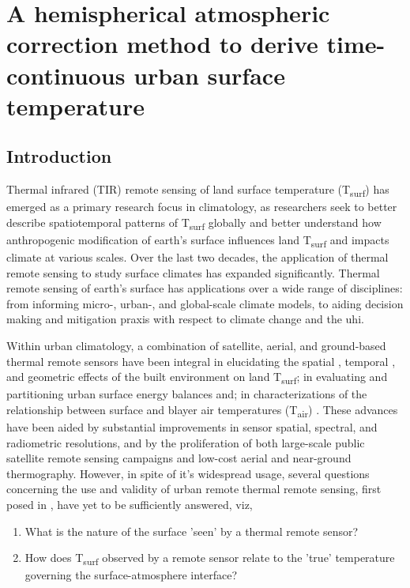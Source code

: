 \chapter{A hemispherical atmospheric correction method to derive time-continuous urban surface temperature}\label{paper1}


\section{Introduction}
Thermal infrared (TIR) remote sensing of land surface temperature (T\textsubscript{surf}) has emerged as a primary research focus in climatology, as researchers seek to better describe spatiotemporal patterns of T\textsubscript{surf} globally and better understand how anthropogenic modification of earth's surface influences land T\textsubscript{surf} and impacts climate at various scales. Over the last two decades, the application of thermal remote sensing to study surface climates has expanded significantly. Thermal remote sensing of earth's surface has applications over a wide range of disciplines: from informing micro-, urban-, and global-scale climate models, to aiding decision making and mitigation praxis with respect to climate change and the \gls{uhi}. 

Within urban climatology, a combination of satellite, aerial, and ground-based thermal remote sensors have been integral in elucidating the spatial \citep{Roth1989}, temporal \citep{Peng2012}, and geometric \citep{Voogt1997} effects of the built environment on land T\textsubscript{surf}; in evaluating and partitioning urban surface energy balances \citep{BastiaanssenW.G.M.1998, Yamaguchi2005} and; in characterizations of the relationship between surface and \gls{blayer} air temperatures (T\textsubscript{air}) \citep{Stoll1992}. These advances have been aided by substantial improvements in sensor spatial, spectral, and radiometric resolutions, and by the proliferation of both large-scale public satellite remote sensing campaigns and low-cost aerial and near-ground thermography. However, in spite of it's widespread usage, several questions concerning the use and validity of urban remote thermal remote sensing, first posed in \citet{Roth1989}, have yet to be sufficiently answered, viz,

\begin{enumerate}
	\item What is the nature of the surface 'seen' by a thermal remote sensor?
	\item How does T\textsubscript{surf} observed by a remote sensor relate to the 'true' temperature governing the surface-atmosphere interface?
\end{enumerate}

